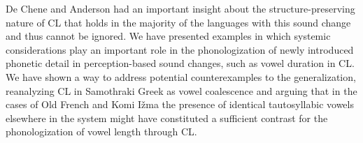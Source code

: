 \documentclass[output=paper,
modfonts
]{LSP/langsci}
\begin{document}
De Chene and Anderson \citeyearpar{deChene1979} had an important insight about the
structure-preserving nature of CL that holds in the majority of the
languages with this sound change and thus cannot be ignored. We have
presented examples in which systemic considerations play an important
role in the phonologization of newly introduced phonetic detail in
perception-based sound changes, such as vowel duration in CL. We have
shown a way to address potential counterexamples to the generalization,
reanalyzing CL in Samothraki Greek as vowel coalescence and arguing that
in the cases of Old French and Komi Ižma the presence of identical
tautosyllabic vowels elsewhere in the system might have constituted a
sufficient contrast for the phonologization of vowel length through
CL.



\printbibliography[heading=subbibliography,notkeyword=this]

\end{document}
